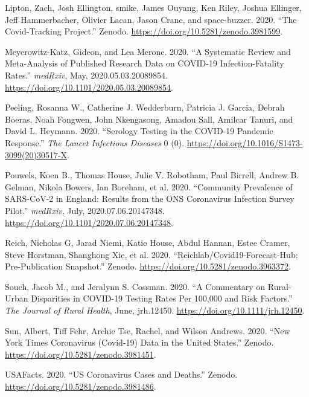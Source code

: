 \documentclass[10pt,letterpaper]{article}
\newlength{\cslhangindent}
\newenvironment{cslreferences}%
  {\setlength{\parindent}{0pt}%
  \everypar{\setlength{\hangindent}{\cslhangindent}}\ignorespaces}%
  {\par}
\begin{document}
\begin{cslreferences}
\leavevmode\hypertarget{ref-zachliptonCovidTrackingProject2020}{}%
Lipton, Zach, Josh Ellington, smike, James Ouyang, Ken Riley, Joshua
Ellinger, Jeff Hammerbacher, Olivier Lacan, Jason Crane, and
space-buzzer. 2020. ``The Covid-Tracking Project.'' Zenodo.
\url{https://doi.org/10.5281/zenodo.3981599}.

\leavevmode\hypertarget{ref-meyerowitz-katzSystematicReviewMetaanalysis2020}{}%
Meyerowitz-Katz, Gideon, and Lea Merone. 2020. ``A Systematic Review and
Meta-Analysis of Published Research Data on COVID-19 Infection-Fatality
Rates.'' \emph{medRxiv}, May, 2020.05.03.20089854.
\url{https://doi.org/10.1101/2020.05.03.20089854}.

\leavevmode\hypertarget{ref-peelingSerologyTestingCOVID192020}{}%
Peeling, Rosanna W., Catherine J. Wedderburn, Patricia J. Garcia, Debrah
Boeras, Noah Fongwen, John Nkengasong, Amadou Sall, Amilcar Tanuri, and
David L. Heymann. 2020. ``Serology Testing in the COVID-19 Pandemic
Response.'' \emph{The Lancet Infectious Diseases} 0 (0).
\url{https://doi.org/10.1016/S1473-3099(20)30517-X}.

\leavevmode\hypertarget{ref-pouwelsCommunityPrevalenceSARSCoV22020}{}%
Pouwels, Koen B., Thomas House, Julie V. Robotham, Paul Birrell, Andrew
B. Gelman, Nikola Bowers, Ian Boreham, et al. 2020. ``Community
Prevalence of SARS-CoV-2 in England: Results from the ONS Coronavirus
Infection Survey Pilot.'' \emph{medRxiv}, July, 2020.07.06.20147348.
\url{https://doi.org/10.1101/2020.07.06.20147348}.

\leavevmode\hypertarget{ref-nicholasgreichReichlabCovid19forecasthubPrepublication2020}{}%
Reich, Nicholas G, Jarad Niemi, Katie House, Abdul Hannan, Estee Cramer,
Steve Horstman, Shanghong Xie, et al. 2020.
``Reichlab/Covid19-Forecast-Hub: Pre-Publication Snapshot.'' Zenodo.
\url{https://doi.org/10.5281/zenodo.3963372}.

\leavevmode\hypertarget{ref-souchCommentaryRuralUrban2020}{}%
Souch, Jacob M., and Jeralynn S. Cossman. 2020. ``A Commentary on
Rural-Urban Disparities in COVID-19 Testing Rates Per 100,000 and Risk
Factors.'' \emph{The Journal of Rural Health}, June, jrh.12450.
\url{https://doi.org/10.1111/jrh.12450}.

\leavevmode\hypertarget{ref-albertsunNewYorkTimes2020}{}%
Sun, Albert, Tiff Fehr, Archie Tse, Rachel, and Wilson Andrews. 2020.
``New York Times Coronavirus (Covid-19) Data in the United States.''
Zenodo. \url{https://doi.org/10.5281/zenodo.3981451}.

\leavevmode\hypertarget{ref-usafactsUSCoronavirusCases2020}{}%
USAFacts. 2020. ``US Coronavirus Cases and Deaths.'' Zenodo.
\url{https://doi.org/10.5281/zenodo.3981486}.


\end{cslreferences}
\end{document}
